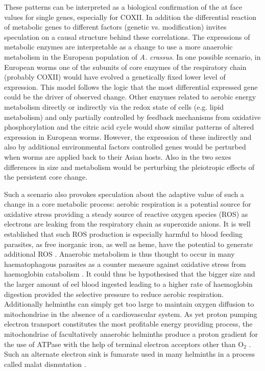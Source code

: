 \documentclass[10pt]{article}
\begin{document}
These patterns can be interpreted as a biological confirmation of the
at face values for single genes, especially for COXII. In addition the
differential reaction of metabolic genes to different factors (genetic
vs. modification) invites speculation on a causal structure behind
these correlations. The expressions of metabolic enzymes are
interpretable as a change to use a more anaerobic metabolism in the
European population of \textit{A. crassus}. In one possible scenario,
in European worms one of the subunits of core enzymes of the
respiratory chain (probably COXII) would have evolved a genetically
fixed lower level of expression. This model follows the logic that the
most differential expressed gene could be the driver of observed
change. Other enzymes related to aerobic energy metabolism directly or
indirectly via the redox state of cells (e.g. lipid metabolism) and
only partially controlled by feedback mechanisms from oxidative
phosphorylation and the citric acid cycle would show similar patterns
of altered expression in European worms. However, the expression of
these indirectly and also by additional environmental factors
controlled genes would be perturbed when worms are applied back to
their Asian hosts. Also in the two sexes differences in size and
metabolism would be perturbing the pleiotropic effects of the
persistent core change.

Such a scenario also provokes speculation about the adaptive value of
such a change in a core metabolic process: aerobic respiration is a
potential source for oxidative stress providing a steady source of
reactive oxygen species (ROS) as electrons are leaking from the
respiratory chain as superoxide anions. It is well established that
such ROS production is especially harmful to blood feeding parasites,
as free inorganic iron, as well as heme, have the potential to
generate additional ROS \cite{pmid21087517}. Anaerobic metabolism is
thus thought to occur in many haematophagous parasites as a counter
measure against oxidative stress from haemoglobin catabolism
\cite{pmid12163151}. It could thus be hypothesised that the bigger
size and the larger amount of eel blood ingested leading to a higher
rate of haemoglobin digestion provided the selective pressure to
reduce aerobic respiration. Additionally helminths can simply get too
large to maintain oxygen diffusion to mitochondriae in the absence of
a cardiovascular system. As yet proton pumping electron transport
constitutes the most profitable energy providing process, the
mitochondriae of facultatively anaerobic helminths produce a proton
gradient for the use of ATPase with the help of terminal electron
acceptors other than O$_2$ \cite{pmid12417132}. Such an alternate
electron sink is fumarate used in many helminths in a process called
malat dismutation \cite{pmid15275412}.
\end{document}
